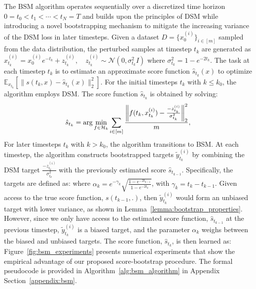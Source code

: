 The BSM algorithm operates sequentially over a discretized time horizon $0 = t_0 < t_1 < \cdots < t_N = T$ and builds upon the principles of DSM while introducing a novel bootstrapping mechanism to mitigate the increasing variance of the DSM loss in later timesteps. Given a dataset $D = \{x_0^{(i)}\}_{i \in [m]}$ sampled from the data distribution, the perturbed samples at timestep $t_k$ are generated as $x_{t_k}^{(i)} = x_{0}^{(i)} e^{-t_k} + z_{t_k}^{(i)}, \quad z_{t_k}^{(i)} \sim \mathcal{N}(0, \sigma_{t_k}^2 I)$ where $\sigma_{t_k}^2 = 1 - e^{-2t_k}$. The task at each timestep $t_k$ is to estimate an approximate score function $\hat{s}_{t_k}(x)$ to optimize $\mathbb{E}_{x_{t_k}}[\|s(t_k, x) - \hat{s}_{t_k}(x)\|_2^2]$. For the initial timesteps $t_k$ with $k \leq k_0$, the algorithm employs DSM. The score function $\hat{s}_{t_k}$ is obtained by solving:
\[
\hat{s}_{t_k} = \arg\min_{f \in \mathcal{H}_k}  \sum_{i \in [m]} \frac{\left\lVert f(t_k, x_{t_k}^{(i)}) - \frac{-z_{t_k}^{(i)}}{\sigma_{t_k}^2}\right\rVert_2^2}{m},
\] 
For later timesteps $t_k$ with $k > k_0$, the algorithm transitions to BSM. At each timestep, the algorithm constructs bootstrapped targets $\tilde{y}_{t_k}^{(i)}$ by combining the DSM target $\frac{-z_{t_k}^{(i)}}{\sigma_{t_k}^2}$ with the previously estimated score $\hat{s}_{t_{k-1}}$. Specifically, the targets are defined as:
where $\alpha_k = e^{-\gamma_k} \sqrt{\frac{1 - e^{-2t_{k-1}}}{1 - e^{-2t_k}}}$, with $\gamma_k = t_k - t_{k-1}$. Given access to the true score function, $s(t_{k-1}, .)$, then $\tilde{y}_{t_k}^{(i)}$ would form an unbiased target with lower variance, as shown in Lemma~\ref{lemma:bootstrap_properties}. However, since we only have access to the estimated score function, $\hat{s}_{t_{k-1}}$ at the previous timestep, $\tilde{y}_{t_k}^{(i)}$ is a biased target, and the parameter $\alpha_{k}$ weighs between the biased and unbiased targets. The score function, $\hat{s}_{t_k}$, is then learned as:
Figure~\ref{fig:bsm_experiments} presents numerical experiments that show the empirical advantage of our proposed score-bootstrap procedure. The formal pseudocode is provided in Algorithm~\ref{alg:bsm_algorithm} in Appendix Section~\ref{appendix:bsm}.
